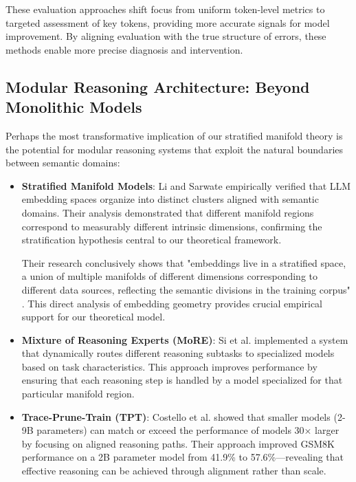 \documentclass{article}
\begin{document}
These evaluation approaches shift focus from uniform token-level metrics to targeted assessment of key tokens, providing more accurate signals for model improvement. By aligning evaluation with the true structure of errors, these methods enable more precise diagnosis and intervention.

\subsection{Modular Reasoning Architecture: Beyond Monolithic Models}

Perhaps the most transformative implication of our stratified manifold theory is the potential for modular reasoning systems that exploit the natural boundaries between semantic domains:

\begin{itemize}
\item \textbf{Stratified Manifold Models}: Li and Sarwate \citep{li2025unraveling} empirically verified that LLM embedding spaces organize into distinct clusters aligned with semantic domains. Their analysis demonstrated that different manifold regions correspond to measurably different intrinsic dimensions, confirming the stratification hypothesis central to our theoretical framework.

  Their research conclusively shows that "embeddings live in a stratified space, a union of multiple manifolds of different dimensions corresponding to different data sources, reflecting the semantic divisions in the training corpus" \citep{li2025unraveling}. This direct analysis of embedding geometry provides crucial empirical support for our theoretical model.

\item \textbf{Mixture of Reasoning Experts (MoRE)}: Si et al. \citep{si2023mixture} implemented a system that dynamically routes different reasoning subtasks to specialized models based on task characteristics. This approach improves performance by ensuring that each reasoning step is handled by a model specialized for that particular manifold region.

\item \textbf{Trace-Prune-Train (TPT)}: Costello et al. \citep{costello2025think} showed that smaller models (2-9B parameters) can match or exceed the performance of models 30× larger by focusing on aligned reasoning paths. Their approach improved GSM8K performance on a 2B parameter model from 41.9\% to 57.6\%—revealing that effective reasoning can be achieved through alignment rather than scale.
\end{itemize}
\end{document}
